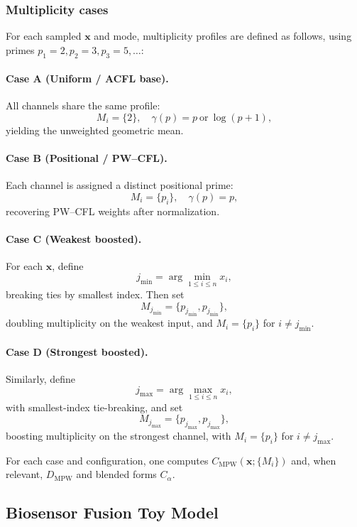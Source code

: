 \documentclass[11pt]{article}
\begin{document}
\subsubsection{Multiplicity cases}

For each sampled $\mathbf{x}$ and mode, multiplicity profiles are defined as follows, using primes $p_1=2, p_2=3, p_3=5,\dots$:

\paragraph{Case A (Uniform / ACFL base).}
All channels share the same profile:
\[
  M_i = \{2\},\quad \gamma(p) = p \ \text{or} \ \log(p+1),
\]
yielding the unweighted geometric mean.

\paragraph{Case B (Positional / PW--CFL).}
Each channel is assigned a distinct positional prime:
\[
  M_i = \{p_i\},\quad \gamma(p) = p,
\]
recovering PW--CFL weights after normalization.

\paragraph{Case C (Weakest boosted).}
For each $\mathbf{x}$, define
\[
  j_{\min} = \arg\min_{1 \le i \le n} x_i,
\]
breaking ties by smallest index. Then set
\[
  M_{j_{\min}} = \{p_{j_{\min}}, p_{j_{\min}}\},
\]
doubling multiplicity on the weakest input, and $M_i = \{p_i\}$ for $i \neq j_{\min}$.

\paragraph{Case D (Strongest boosted).}
Similarly, define
\[
  j_{\max} = \arg\max_{1 \le i \le n} x_i,
\]
with smallest-index tie-breaking, and set
\[
  M_{j_{\max}} = \{p_{j_{\max}}, p_{j_{\max}}\},
\]
boosting multiplicity on the strongest channel, with $M_i = \{p_i\}$ for $i \neq j_{\max}$.

For each case and configuration, one computes $C_{\mathrm{MPW}}(\mathbf{x};\{M_i\})$ and, when relevant, $D_{\mathrm{MPW}}$ and blended forms $C_\alpha$.

\subsection{Biosensor Fusion Toy Model}
\label{subsec:biosensor-toy}
\end{document}
